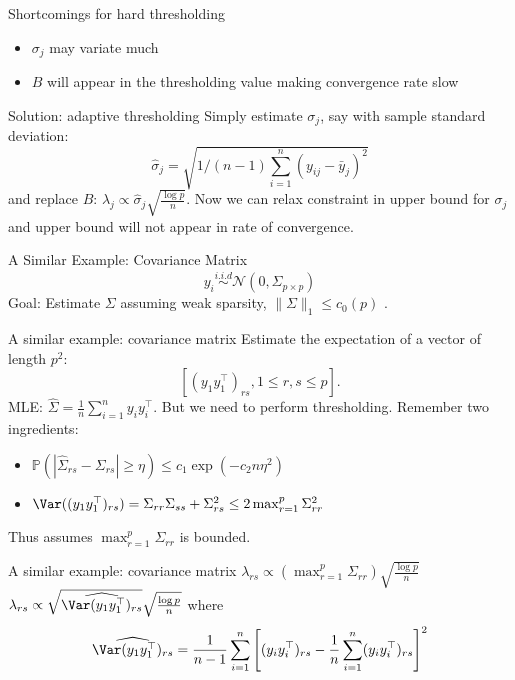 \documentclass[handout,xcolor={usenames,dvipsnames}]{beamer}
\begin{document}
\begin{frame}{Shortcomings for hard thresholding}
\begin{itemize}
	\item $\sigma_j$ may variate much
	\item $B$ will appear in the thresholding value making convergence rate slow 
\end{itemize}
\end{frame}


\begin{frame}{Solution: adaptive thresholding}
Simply estimate $\sigma_j$, say with sample standard deviation: 
\[
\hat{\sigma}_j = \sqrt{1/(n-1)\sum_{i=1}^n (y_{ij} - \bar{y}_j)^2}
\]
and replace $B$: $\lambda_j \propto \hat{\sigma}_j \sqrt{\frac{\log p}{n}}$.  Now we can relax constraint in upper bound for $\sigma_j$ and upper bound will not appear in rate of convergence. 
\end{frame}

\begin{frame}{A Similar Example: Covariance Matrix}
\[
y_i \overset{i.i.d}{\sim} \mathcal{N}(0, \Sigma_{p\times p})
\]
{\color{red} Goal:} Estimate $\Sigma$ assuming weak sparsity, $\|\Sigma\|_{1}\le c_0(p)$ .  
\end{frame}


\begin{frame}{A similar example: covariance matrix}
Estimate the expectation of a vector of length $p^2$:
\[
[(y_1y_1^\top )_{rs}, 1\le r, s\le p]. 
\]
{\color{red} MLE:} $\hat{\Sigma} = \frac{1}{n} \sum_{i=1}^n y_i y_i^\top$.  But we need to perform thresholding.  Remember two ingredients:
\begin{itemize}
\item $\mathbb{P}(|\hat{\Sigma}_{rs} - \Sigma_{rs}|\ge \eta) \le c_1\exp(-c_2n\eta^2)$
\item $\Var((y_1y_1^\top)_{rs}) = \Sigma_{rr}\Sigma_{ss}+\Sigma^2_{rs} \le 2\max_{r=1}^p\Sigma^2_{rr}$
\end{itemize}
Thus  assumes $\max_{r=1}^p\Sigma_{rr}$ is bounded. 
\end{frame}

\begin{frame}{A similar example: covariance matrix}
 $\lambda_{rs} \propto (\max_{r=1}^p \Sigma_{rr}) \sqrt{\frac{\log p}{n}}$ \\ 
 $\lambda_{rs} \propto \sqrt{\widehat{\Var(y_1y_1^\top)_{rs}}}\sqrt{\frac{\log p}{n}}$
where 
\[
\widehat{\Var(y_1y_1^\top)_{rs}} = \frac{1}{n-1}\sum_{i=1}^n \left[(y_iy_i^\top)_{rs} -  \frac{1}{n} \sum_{i=1}^n (y_iy_i^\top)_{rs} \right]^2
\]
\end{frame}
\end{document}
